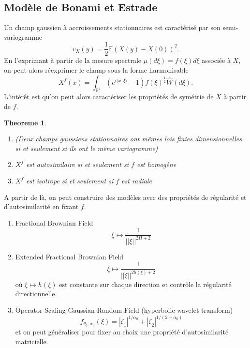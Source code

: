 \documentclass[11pt]{article} %
\newtheorem{theoreme}{Theoreme}[section]
\begin{document}
\subsection{Modèle de Bonami et Estrade}
	Un champ gaussien à accroissements stationnaires est caractérisé par son semi-variogramme
	\begin{equation}
		v_X(y) = \frac{1}{2}\mathbb{E}(X(y) - X(0))^2.
	\end{equation}
	En l'exprimant à partir de la mesure spectrale $\mu(d\xi) = f(\xi)d\xi$ associée à $X$, on peut alors réexprimer le champ sous la forme harmonisable
	\begin{equation}
		X^f(x) = \int_{\mathbb{R}^2} \left( e^{i\langle x, \xi\rangle} - 1\right) f(\xi)^{\frac{1}{2}}\hat{W}(d\xi).
	\end{equation}
	L'intérêt est qu'on peut alors caractériser les propriétés de symétrie de $X$ à partir de $f$.
	\begin{theoreme}
		\begin{enumerate}
			\item (Deux champs gaussiens stationnaires ont mêmes lois finies dimensionnelles si et seulement si ils ont le même variogramme)
			\item $X^f$ est autosimilaire si et seulement si $f$ est homogène
			\item $X^f$ est isotrope si et seulement si $f$ est radiale
		\end{enumerate}
	\end{theoreme}
	A partir de là, on peut construire des modèles avec des propriétés de régularité et d'autosimilarité en fixant $f$.
	\begin{enumerate}
		\item Fractional Brownian Field
		\begin{equation}
			\xi \mapsto \frac{1}{||\xi||^{2H + 2}}
		\end{equation} 
		\item Extended Fractional Brownian Field
		\begin{equation}
			\xi \mapsto \frac{1}{||\xi||^{2h(\xi) + 2}}
		\end{equation}
		où $\xi\mapsto h(\xi)$ est constante sur chaque direction et contrôle la régularité directionnelle.
		
		\item Operator Scaling Gaussian Random Field (hyperbolic wavelet transform)
		\begin{equation}
			f_{\theta_0, \alpha_0}(\xi) = |\zeta_1|^{1/\alpha_0} + |\zeta_2|^{1/(2-\alpha_0)}
		\end{equation}
		et on peut généraliser pour fixer au choix une propriété d'autosimilarité matricielle.
	\end{enumerate}
\end{document}
